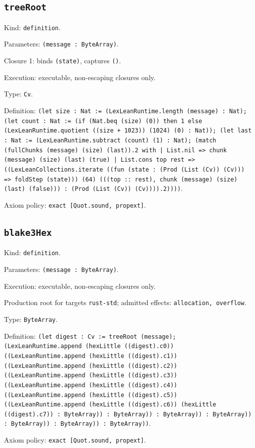 \documentclass[11pt]{article}
\begin{document}
\subsection*{\texttt{treeRoot}}
\noindent Kind: \texttt{definition}.\par
\noindent Parameters: \texttt{(message : ByteArray)}.\par
\noindent Closure 1: binds \texttt{(state)}, captures \texttt{()}.\par
\noindent Execution: executable, non-escaping closures only.\par
\noindent Type: \texttt{Cv}.\par
\noindent Definition: \texttt{(let size : Nat := (LexLeanRuntime.length (message) : Nat); (let count : Nat := (if (Nat.beq (size) (0)) then 1 else (LexLeanRuntime.quotient ((size + 1023)) (1024) (0) : Nat)); (let last : Nat := (LexLeanRuntime.subtract (count) (1) : Nat); (match (fullChunks (message) (size) (last)).2 with | List.nil => chunk (message) (size) (last) (true) | List.cons top rest => ((LexLeanCollections.iterate ((fun (state : (Prod (List (Cv)) (Cv))) => foldStep (state))) (64) (((top :: rest), chunk (message) (size) (last) (false))) : (Prod (List (Cv)) (Cv)))).2))))}.\par
\noindent Axiom policy: \texttt{exact [Quot.sound, propext]}.\par
\subsection*{\texttt{blake3Hex}}
\noindent Kind: \texttt{definition}.\par
\noindent Parameters: \texttt{(message : ByteArray)}.\par
\noindent Execution: executable, non-escaping closures only.\par
\noindent Production root for targets \texttt{rust-std}; admitted effects: \texttt{allocation, overflow}.\par
\noindent Type: \texttt{ByteArray}.\par
\noindent Definition: \texttt{(let digest : Cv := treeRoot (message); (LexLeanRuntime.append (hexLittle ((digest).c0)) ((LexLeanRuntime.append (hexLittle ((digest).c1)) ((LexLeanRuntime.append (hexLittle ((digest).c2)) ((LexLeanRuntime.append (hexLittle ((digest).c3)) ((LexLeanRuntime.append (hexLittle ((digest).c4)) ((LexLeanRuntime.append (hexLittle ((digest).c5)) ((LexLeanRuntime.append (hexLittle ((digest).c6)) (hexLittle ((digest).c7)) : ByteArray)) : ByteArray)) : ByteArray)) : ByteArray)) : ByteArray)) : ByteArray)) : ByteArray))}.\par
\noindent Axiom policy: \texttt{exact [Quot.sound, propext]}.\par
\end{document}
